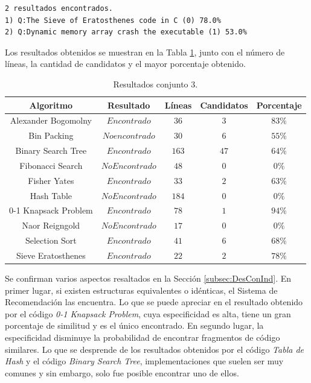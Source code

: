 \begin{lstlisting}[caption={The Sieve of Eratosthenes.},label={lst:sieve}]
2 resultados encontrados.
1) Q:The Sieve of Eratosthenes code in C (0) 78.0%
2) Q:Dynamic memory array crash the executable (1) 53.0%
\end{lstlisting}

Los resultados obtenidos se muestran en la Tabla \ref{tab:res3},
junto con el número de líneas,
la cantidad de candidatos y
el mayor porcentaje obtenido.

\begin{table}[h]
\caption{Resultados conjunto 3.}
\label{tab:res3}
\centering
\begin{tabular}{ccccc}
\hline
{Algoritmo} & {Resultado} & {Líneas} & {Candidatos} & {Porcentaje} \\
\hline
Alexander Bogomolny & $Encontrado$ & $36$ & $3$ & $83\%$ \\
Bin Packing & $No encontrado$ & $30$ & $6$ & $55\%$ \\
Binary Search Tree & $Encontrado$ & $163$ & $47$ & $64\%$ \\
Fibonacci Search & $No Encontrado$ & $48$ & $0$ & $0\%$ \\
Fisher Yates & $Encontrado$ & $33$ & $2$ & $63\%$ \\
Hash Table & $No Encontrado$ & $184$ & $0$ & $0\%$ \\
0-1 Knapsack Problem & $Encontrado$ & $78$ & $1$ & $94\%$ \\
Naor Reigngold & $No Encontrado$ & $17$ & $0$ & $0\%$ \\
Selection Sort & $Encontrado$ & $41$ & $6$ & $68\%$ \\
Sieve Eratosthenes & $Encontrado$ & $22$ & $2$ & $78\%$ \\
\hline
\end{tabular}
\end{table}

Se confirman varios aspectos resaltados en la Sección \ref{subsec:DesConInd}.
En primer lugar, si existen estructuras equivalentes o idénticas, 
el Sistema de Recomendación las encuentra.
Lo que se puede apreciar en el resultado obtenido por el código \textit{0-1 Knapsack Problem},
cuya especificidad es alta, tiene un gran porcentaje de similitud y es el único encontrado.
En segundo lugar, la especificidad disminuye la probabilidad de encontrar fragmentos de código similares.
Lo que se desprende de los resultados obtenidos por el código \textit{Tabla de Hash} y el código \textit{Binary Search Tree},
implementaciones que suelen ser muy comunes y sin embargo, solo fue posible encontrar uno de ellos.

